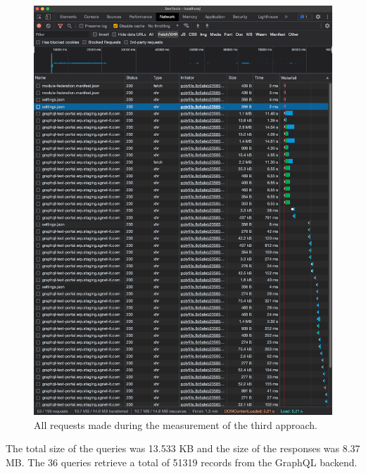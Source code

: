 \ifshowImages
\begin{figure}[H]
\centering
\includegraphics[width=0.6\linewidth]{images/results/1-attempt/no-shared-cache-no-reduction.png}
\caption{All requests made during the measurement of the third approach.}\label{fig:results:shared-cache-reduction}
\end{figure}
\fi

\noindent The total size of the queries was 13.533 KB and the size of the responses was 8.37 MB. The 36 queries retrieve a total of 51319 records from the GraphQL backend.






